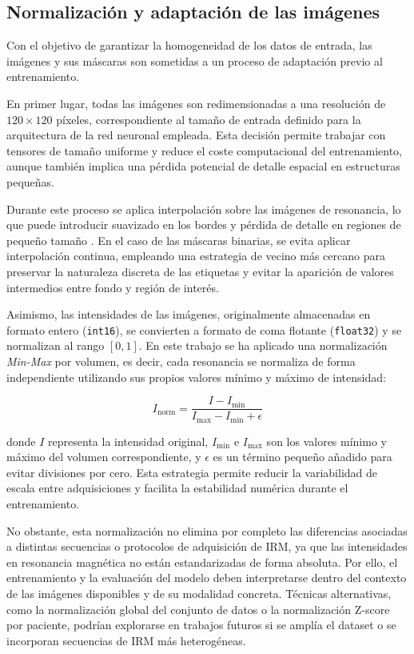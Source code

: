 \subsection{Normalización y adaptación de las imágenes}

Con el objetivo de garantizar la homogeneidad de los datos de entrada, las imágenes y sus máscaras son sometidas a un proceso de adaptación previo al entrenamiento.

En primer lugar, todas las imágenes son redimensionadas a una resolución de \(120 \times 120\) píxeles, correspondiente al tamaño de entrada definido para la arquitectura de la red neuronal empleada. Esta decisión permite trabajar con tensores de tamaño uniforme y reduce el coste computacional del entrenamiento, aunque también implica una pérdida potencial de detalle espacial en estructuras pequeñas.

Durante este proceso se aplica interpolación sobre las imágenes de resonancia, lo que puede introducir suavizado en los bordes y pérdida de detalle en regiones de pequeño tamaño \citep{lehmann1999survey}. En el caso de las máscaras binarias, se evita aplicar interpolación continua, empleando una estrategia de vecino más cercano para preservar la naturaleza discreta de las etiquetas y evitar la aparición de valores intermedios entre fondo y región de interés.

Asimismo, las intensidades de las imágenes, originalmente almacenadas en formato entero (\texttt{int16}), se convierten a formato de coma flotante (\texttt{float32}) y se normalizan al rango \([0,1]\). En este trabajo se ha aplicado una normalización \textit{Min-Max} por volumen, es decir, cada resonancia se normaliza de forma independiente utilizando sus propios valores mínimo y máximo de intensidad:

\[
I_{\text{norm}} = \frac{I - I_{\min}}{I_{\max} - I_{\min} + \epsilon}
\]

donde \(I\) representa la intensidad original, \(I_{\min}\) e \(I_{\max}\) son los valores mínimo y máximo del volumen correspondiente, y \(\epsilon\) es un término pequeño añadido para evitar divisiones por cero. Esta estrategia permite reducir la variabilidad de escala entre adquisiciones y facilita la estabilidad numérica durante el entrenamiento.

No obstante, esta normalización no elimina por completo las diferencias asociadas a distintas secuencias o protocolos de adquisición de IRM, ya que las intensidades en resonancia magnética no están estandarizadas de forma absoluta. Por ello, el entrenamiento y la evaluación del modelo deben interpretarse dentro del contexto de las imágenes disponibles y de su modalidad concreta. Técnicas alternativas, como la normalización global del conjunto de datos o la normalización Z-score por paciente, podrían explorarse en trabajos futuros si se amplía el dataset o se incorporan secuencias de IRM más heterogéneas.

